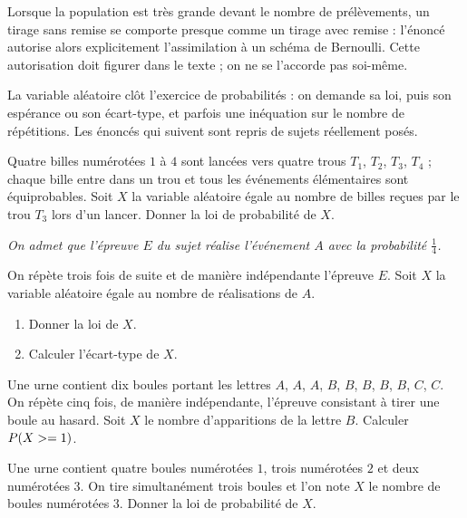 \begin{remarque}
Lorsque la population est très grande devant le nombre de prélèvements, un
tirage sans remise se comporte presque comme un tirage avec remise : l'énoncé
autorise alors explicitement l'assimilation à un schéma de Bernoulli. Cette
autorisation doit figurer dans le texte ; on ne se l'accorde pas soi-même.
\end{remarque}

\begin{annales}
La variable aléatoire clôt l'exercice de probabilités : on demande sa loi,
puis son espérance ou son écart-type, et parfois une inéquation sur le nombre
de répétitions. Les énoncés qui suivent sont repris de sujets réellement
posés.

Quatre billes numérotées $1$ à $4$ sont lancées vers quatre trous $T_{1}$,
$T_{2}$, $T_{3}$, $T_{4}$ ; chaque bille entre dans un trou et tous les
événements élémentaires sont équiprobables. Soit $X$ la variable aléatoire
égale au nombre de billes reçues par le trou $T_{3}$ lors d'un lancer. Donner
la loi de probabilité de $X$.

\emph{On admet que l'épreuve $E$ du sujet réalise l'événement $A$ avec la
probabilité $\frac14$.}

On répète trois fois de suite et de manière indépendante l'épreuve $E$. Soit
$X$ la variable aléatoire égale au nombre de réalisations de $A$.
\begin{enumerate}[label=\textbf{\alph*)}, leftmargin=*, itemsep=0.15em]
  \item Donner la loi de $X$.
  \item Calculer l'écart-type de $X$.
\end{enumerate}

Une urne contient dix boules portant les lettres $A$, $A$, $A$, $B$, $B$,
$B$, $B$, $B$, $C$, $C$. On répète cinq fois, de manière indépendante,
l'épreuve consistant à tirer une boule au hasard. Soit $X$ le nombre
d'apparitions de la lettre $B$. Calculer $P\!\left(X >= 1\right)$.

Une urne contient quatre boules numérotées $1$, trois numérotées $2$ et deux
numérotées $3$. On tire simultanément trois boules et l'on note $X$ le nombre
de boules numérotées $3$. Donner la loi de probabilité de $X$.


\end{annales}
